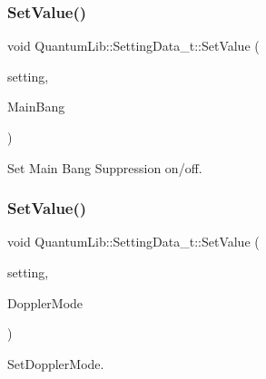 \subsubsection{\texorpdfstring{Set\+Value()}{SetValue()}\hspace{0.1cm}{\footnotesize\ttfamily [19/26]}}
{\footnotesize\ttfamily void Quantum\+Lib\+::\+Setting\+Data\+\_\+t\+::\+Set\+Value (\begin{DoxyParamCaption}\item[{\mbox{\hyperlink{namespace_quantum_lib_acc8124e3e65bca4aa798d03a55e3d54c}{e\+Settings\+\_\+t}}}]{setting,  }\item[{\mbox{\hyperlink{namespace_quantum_lib_af78fc1282ff8d85de46fff58a89f5798}{e\+Main\+Bang\+\_\+t}}}]{Main\+Bang }\end{DoxyParamCaption})\hspace{0.3cm}{\ttfamily [inline]}}



Set Main Bang Suppression on/off. 

\mbox{\label{struct_quantum_lib_1_1_setting_data__t_ad6abb3dbfcd6f8bc5cb33ef75f8b2656}} 
\subsubsection{\texorpdfstring{Set\+Value()}{SetValue()}\hspace{0.1cm}{\footnotesize\ttfamily [20/26]}}
{\footnotesize\ttfamily void Quantum\+Lib\+::\+Setting\+Data\+\_\+t\+::\+Set\+Value (\begin{DoxyParamCaption}\item[{\mbox{\hyperlink{namespace_quantum_lib_acc8124e3e65bca4aa798d03a55e3d54c}{e\+Settings\+\_\+t}}}]{setting,  }\item[{\mbox{\hyperlink{namespace_quantum_lib_a67a865bb9894671b27595a61dfcd44b5}{e\+Doppler\+Mode\+\_\+t}}}]{Doppler\+Mode }\end{DoxyParamCaption})\hspace{0.3cm}{\ttfamily [inline]}}



Set\+Doppler\+Mode. 

\mbox{\label{struct_quantum_lib_1_1_setting_data__t_ad515aac063176db62a229cc907c94b7b}} 
